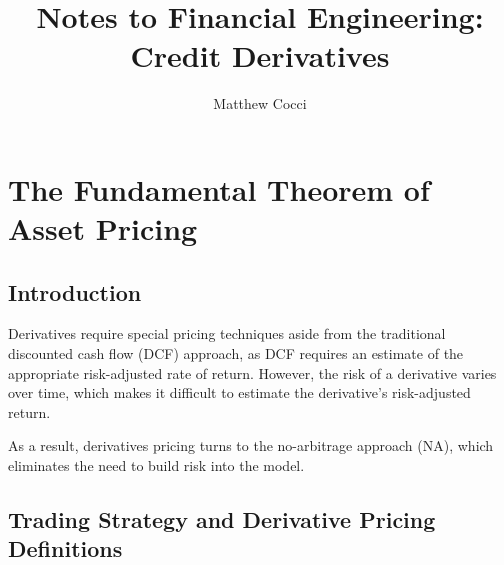 \documentclass[a4paper,12pt]{scrartcl}
\author{Matthew Cocci}
\title{Notes to Financial Engineering: \\Credit Derivatives}
\date{}
\begin{document}
\maketitle

\tableofcontents

\newpage
\section{The Fundamental Theorem of Asset Pricing}

\subsection{Introduction}

Derivatives require special pricing techniques aside from the traditional
discounted cash flow (DCF) approach, as DCF requires an estimate of the
appropriate risk-adjusted rate of return.  However, the risk of a 
derivative varies over time, which makes it difficult to estimate the
derivative's risk-adjusted return.

As a result, derivatives pricing turns to the no-arbitrage approach (NA),
which eliminates the need to build risk into the model.  

\subsection{Trading Strategy and Derivative Pricing Definitions}
\end{document}
